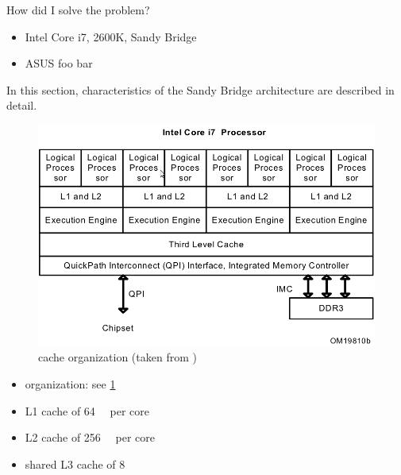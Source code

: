 
How did I solve the problem?

\label{sec:hw}


\label{sec:hw-products}

\begin{itemize}

\item Intel Core i7, 2600K, Sandy Bridge

\item ASUS foo bar

\end{itemize}


\label{sec:sandy-bridge}

In this section, characteristics of the Sandy Bridge architecture are described
in detail.

\begin{figure}
  \centering
    \includegraphics[width=\textwidth]{fig/intel-cache-orga.png}
  \caption{\JWPcpu cache organization (taken from \cite{intel2011softdev})}
  \label{fig:cache-orga}
\end{figure}



\begin{itemize}

\item organization: see \ref{fig:cache-orga}

\item L1 cache of \SI{64}{\kilo\byte} per core\cite{intel2011softdev}

\item L2 cache of \SI{256}{\kilo\byte} per core\cite{intel2011softdev}

\item shared L3 cache of \SI{8}{\mega\byte}\cite{intel2011softdev}

\end{itemize}



